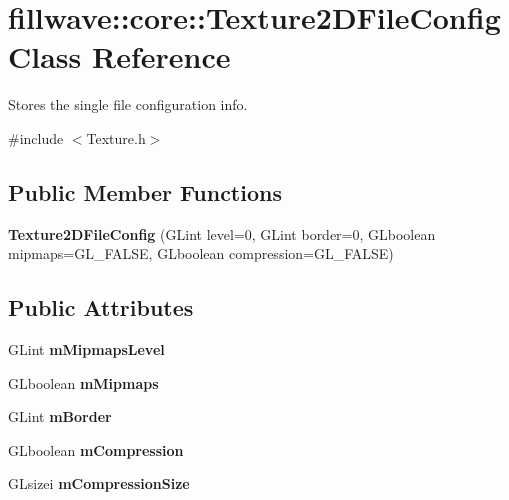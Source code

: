 \hypertarget{classfillwave_1_1core_1_1Texture2DFileConfig}{}\section{fillwave\+:\+:core\+:\+:Texture2\+D\+File\+Config Class Reference}
\label{classfillwave_1_1core_1_1Texture2DFileConfig}


Stores the single file configuration info.  




{\ttfamily \#include $<$Texture.\+h$>$}

\subsection*{Public Member Functions}
\begin{DoxyCompactItemize}
\item 
\hypertarget{classfillwave_1_1core_1_1Texture2DFileConfig_af24ff82fa8014289f08b5774bad73f36}{}{\bfseries Texture2\+D\+File\+Config} (G\+Lint level=0, G\+Lint border=0, G\+Lboolean mipmaps=G\+L\+\_\+\+F\+A\+L\+S\+E, G\+Lboolean compression=G\+L\+\_\+\+F\+A\+L\+S\+E)\label{classfillwave_1_1core_1_1Texture2DFileConfig_af24ff82fa8014289f08b5774bad73f36}

\end{DoxyCompactItemize}
\subsection*{Public Attributes}
\begin{DoxyCompactItemize}
\item 
\hypertarget{classfillwave_1_1core_1_1Texture2DFileConfig_a18a1a818bdefd293b6861893fedb56fc}{}G\+Lint {\bfseries m\+Mipmaps\+Level}\label{classfillwave_1_1core_1_1Texture2DFileConfig_a18a1a818bdefd293b6861893fedb56fc}

\item 
\hypertarget{classfillwave_1_1core_1_1Texture2DFileConfig_af2412d3609748ec726594c40d4122e69}{}G\+Lboolean {\bfseries m\+Mipmaps}\label{classfillwave_1_1core_1_1Texture2DFileConfig_af2412d3609748ec726594c40d4122e69}

\item 
\hypertarget{classfillwave_1_1core_1_1Texture2DFileConfig_a33b1d55d9fb4048b4628c9bf3539d133}{}G\+Lint {\bfseries m\+Border}\label{classfillwave_1_1core_1_1Texture2DFileConfig_a33b1d55d9fb4048b4628c9bf3539d133}

\item 
\hypertarget{classfillwave_1_1core_1_1Texture2DFileConfig_ae4bd01d5bd336805712b61426e2bc924}{}G\+Lboolean {\bfseries m\+Compression}\label{classfillwave_1_1core_1_1Texture2DFileConfig_ae4bd01d5bd336805712b61426e2bc924}

\item 
\hypertarget{classfillwave_1_1core_1_1Texture2DFileConfig_a4a4cd0188cae7bb3aaccf1a643b4be7f}{}G\+Lsizei {\bfseries m\+Compression\+Size}\label{classfillwave_1_1core_1_1Texture2DFileConfig_a4a4cd0188cae7bb3aaccf1a643b4be7f}

\end{DoxyCompactItemize}


